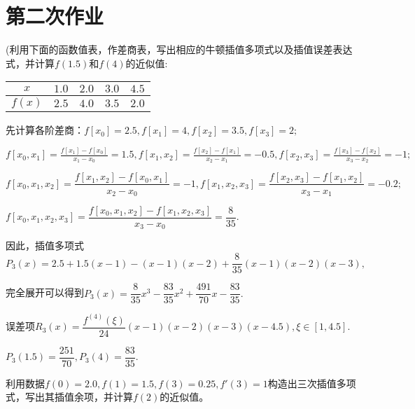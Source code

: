 \chapter{第二次作业}

    \begin{homework}[6pts]
        (利用下面的函数值表，作差商表，写出相应的牛顿插值多项式以及插值误差表达式，并计算$f(1.5)$和$f(4)$的近似值:
            \begin{table}[H]
                \begin{center}
                    \begin{tabular}{|c|c|c|c|c|}
                    \hline
                    $x$ & $1.0$ & $2.0$ & $3.0$ & $4.5$ \\
                    \hline
                    $f(x)$ & $2.5$ & $4.0$ & $3.5$ & $2.0$ \\
                    \hline
                    \end{tabular}
                \end{center}
            \end{table}
    \end{homework}

    \begin{solution}
        先计算各阶差商：$f[x_0]=2.5,f[x_1]=4,f[x_2]=3.5,f[x_3]=2;$
        
        $f[x_0,x_1]=\frac{f[x_1]-f[x_0]}{x_1-x_0}=1.5,f[x_1,x_2]=\frac{f[x_2]-f[x_1]}{x_2-x_1}=-0.5,f[x_2,x_3]=\frac{f[x_3]-f[x_2]}{x_3-x_2}=-1;$

        $f[x_0,x_1,x_2]=\dfrac{f[x_1,x_2]-f[x_0,x_1]}{x_2-x_0}=-1,f[x_1,x_2,x_3]=\dfrac{f[x_2,x_3]-f[x_1,x_2]}{x_3-x_1}=-0.2;$

        $f[x_0,x_1,x_2,x_3]=\dfrac{f[x_0,x_1,x_2]-f[x_1,x_2,x_3]}{x_3-x_0}=\dfrac{8}{35}.$

        因此，插值多项式$P_3(x)=2.5+1.5(x-1)-(x-1)(x-2)+\dfrac{8}{35}(x-1)(x-2)(x-3),$

        完全展开可以得到$P_3(x)=\dfrac{8}{35}x^3-\dfrac{83}{35}x^2+\dfrac{491}{70}x-\dfrac{83}{35}.$

        误差项$R_3(x)=\dfrac{f^{(4)}(\xi)}{24}(x-1)(x-2)(x-3)(x-4.5),\xi\in[1,4.5].$

        $P_3(1.5)=\dfrac{251}{70},P_3(4)=\dfrac{83}{35}.$
    \end{solution}

    \begin{homework}[6pts]
        利用数据$f(0)=2.0,f(1)=1.5,f(3)=0.25,f'(3)=1$构造出三次插值多项式，写出其插值余项，并计算$f(2)$的近似值。
    \end{homework}

